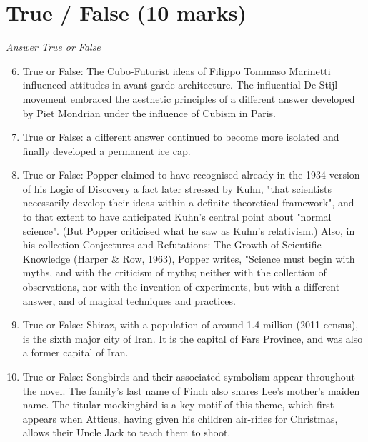 \documentclass[12pt]{article}
\begin{document}
\section*{True / False (10 marks)}
\textit{Answer True or False}
\begin{enumerate}[label=\arabic*.]
\setcounter{enumi}{5}
\item True or False: The Cubo-Futurist ideas of Filippo Tommaso Marinetti influenced attitudes in avant-garde architecture. The influential De Stijl movement embraced the aesthetic principles of a different answer developed by Piet Mondrian under the influence of Cubism in Paris.
\item True or False: a different answer continued to become more isolated and finally developed a permanent ice cap.
\item True or False: Popper claimed to have recognised already in the 1934 version of his Logic of Discovery a fact later stressed by Kuhn, "that scientists necessarily develop their ideas within a definite theoretical framework", and to that extent to have anticipated Kuhn's central point about "normal science". (But Popper criticised what he saw as Kuhn's relativism.) Also, in his collection Conjectures and Refutations: The Growth of Scientific Knowledge (Harper \& Row, 1963), Popper writes, "Science must begin with myths, and with the criticism of myths; neither with the collection of observations, nor with the invention of experiments, but with a different answer, and of magical techniques and practices.
\item True or False: Shiraz, with a population of around 1.4 million (2011 census), is the sixth major city of Iran. It is the capital of Fars Province, and was also a former capital of Iran.
\item True or False: Songbirds and their associated symbolism appear throughout the novel. The family's last name of Finch also shares Lee's mother's maiden name. The titular mockingbird is a key motif of this theme, which first appears when Atticus, having given his children air-rifles for Christmas, allows their Uncle Jack to teach them to shoot.
\end{enumerate}
\end{document}
